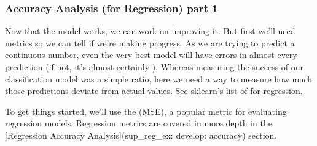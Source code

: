 \documentclass[letterpaper,10pt,english]{jupyterBook}
\begin{document}
\subsubsection{Accuracy Analysis (for Regression) part 1}
\label{\detokenize{task2_c/example_sup_reg/sup_reg_ex_develop:accuracy-analysis-for-regression-part-1}}\label{\detokenize{task2_c/example_sup_reg/sup_reg_ex_develop:sup-reg-ex-develop-accuracy}}
\sphinxAtStartPar
Now that the model works, we can work on improving it. But first we’ll need metrics so we can tell if we’re making progress. As we are trying to predict a continuous number, even the very best model will have errors in almost every prediction (if not, it’s almost certainly ). Whereas measuring the success of our classification model was a simple ratio, here we need a way to measure how much those predictions deviate from actual values. See sklearn’s list of  for regression.

\sphinxAtStartPar
To get things started, we’ll use the  (MSE), a popular metric for evaluating regression models. Regression metrics are covered in more depth in the {[}Regression Accuracy Analysis{]}(sup\_reg\_ex: develop: accuracy) section.
\end{document}
